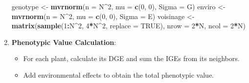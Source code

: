 \documentclass[
]{article}
\newenvironment{Shaded}{\begin{snugshade}}{\end{snugshade}}
\newcommand{\AttributeTok}[1]{\textcolor[rgb]{0.13,0.29,0.53}{#1}}
\newcommand{\ConstantTok}[1]{\textcolor[rgb]{0.56,0.35,0.01}{#1}}
\newcommand{\DecValTok}[1]{\textcolor[rgb]{0.00,0.00,0.81}{#1}}
\newcommand{\FunctionTok}[1]{\textcolor[rgb]{0.13,0.29,0.53}{\textbf{#1}}}
\newcommand{\NormalTok}[1]{#1}
\newcommand{\OtherTok}[1]{\textcolor[rgb]{0.56,0.35,0.01}{#1}}
\newcommand{\SpecialCharTok}[1]{\textcolor[rgb]{0.81,0.36,0.00}{\textbf{#1}}}
\providecommand{\tightlist}{%
  \setlength{\itemsep}{0pt}\setlength{\parskip}{0pt}}
\begin{document}
\begin{enumerate}
\begin{Shaded}
\begin{Highlighting}[]
\NormalTok{genotype }\OtherTok{\textless{}{-}} \FunctionTok{mvrnorm}\NormalTok{(}\AttributeTok{n =}\NormalTok{ N}\SpecialCharTok{\^{}}\DecValTok{2}\NormalTok{, }\AttributeTok{mu =} \FunctionTok{c}\NormalTok{(}\DecValTok{0}\NormalTok{, }\DecValTok{0}\NormalTok{), }\AttributeTok{Sigma =}\NormalTok{ G)}
\NormalTok{enviro }\OtherTok{\textless{}{-}} \FunctionTok{mvrnorm}\NormalTok{(}\AttributeTok{n =}\NormalTok{ N}\SpecialCharTok{\^{}}\DecValTok{2}\NormalTok{, }\AttributeTok{mu =} \FunctionTok{c}\NormalTok{(}\DecValTok{0}\NormalTok{, }\DecValTok{0}\NormalTok{), }\AttributeTok{Sigma =}\NormalTok{ E)}
\NormalTok{voisinage }\OtherTok{\textless{}{-}} \FunctionTok{matrix}\NormalTok{(}\FunctionTok{sample}\NormalTok{(}\DecValTok{1}\SpecialCharTok{:}\NormalTok{N}\SpecialCharTok{\^{}}\DecValTok{2}\NormalTok{, }\DecValTok{4}\SpecialCharTok{*}\NormalTok{N}\SpecialCharTok{\^{}}\DecValTok{2}\NormalTok{, }\AttributeTok{replace =} \ConstantTok{TRUE}\NormalTok{), }\AttributeTok{nrow =} \DecValTok{2}\SpecialCharTok{*}\NormalTok{N, }\AttributeTok{ncol =} \DecValTok{2}\SpecialCharTok{*}\NormalTok{N)}
\end{Highlighting}
\end{Shaded}
\item
  \textbf{Phenotypic Value Calculation}:

  \begin{itemize}
  \tightlist
  \item
    For each plant, calculate its DGE and sum the IGEs from its
    neighbors.
  \item
    Add environmental effects to obtain the total phenotypic value.
  \end{itemize}


\end{enumerate}
\end{document}
